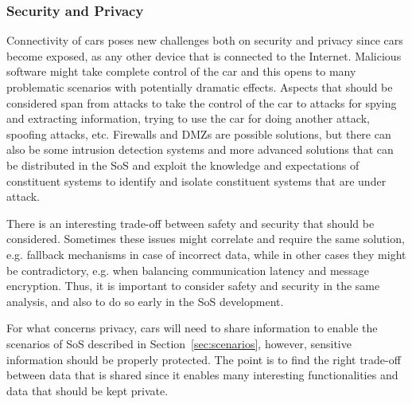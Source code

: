 
\subsubsection{Security and Privacy}

Connectivity of cars poses new challenges both on security and privacy since cars become exposed, as any other device that is connected to the Internet. Malicious software might take complete control of the car and this opens to many problematic scenarios with potentially dramatic effects.
Aspects that should be considered span from attacks to take the control of the car to attacks for spying and extracting information, trying to use the car for doing another attack, spoofing attacks, etc.
Firewalls and DMZs are possible solutions, but there can also be some intrusion detection systems and more advanced solutions that can be distributed in the SoS and exploit the knowledge and expectations of constituent systems to identify and isolate constituent systems that are under attack.

There is an interesting trade-off between safety and security that should be considered. Sometimes these issues might correlate and require the same solution, e.g. fallback mechanisms in case of incorrect data, while in other cases they might be contradictory, e.g. when balancing communication latency and message encryption. Thus, it is important to consider safety and security in the same analysis, and also to do so early in the SoS development.

For what concerns privacy, cars will need to share information
to enable the scenarios of SoS described in Section~\ref{sec:scenarios}, however, sensitive information should be properly
protected. %
The point is to find the right trade-off between data that is shared since it enables many interesting functionalities and data that should be kept private.

